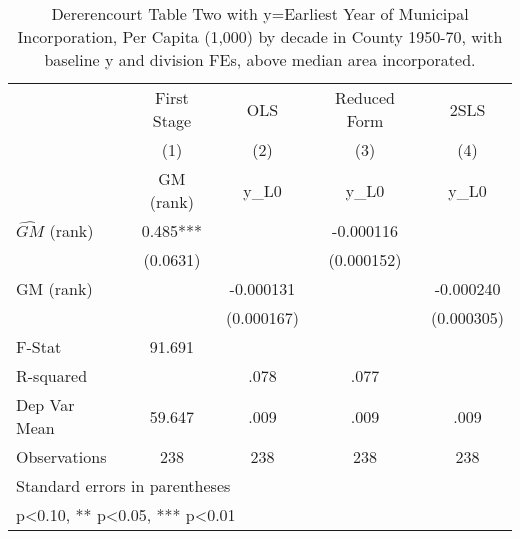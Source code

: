 \begin{table}[htbp]\centering
\def\sym#1{\ifmmode^{#1}\else\(^{#1}\)\fi}
\caption{Dererencourt Table Two with y=Earliest Year of Municipal Incorporation, Per Capita (1,000) by decade in County 1950-70, with baseline y and division FEs, above median area incorporated.}
\begin{tabular}{l*{4}{c}}
\toprule
                    & First Stage   &         OLS   &Reduced Form   &        2SLS   \\
                    &\multicolumn{1}{c}{(1)}&\multicolumn{1}{c}{(2)}&\multicolumn{1}{c}{(3)}&\multicolumn{1}{c}{(4)}\\
                    &\multicolumn{1}{c}{GM  (rank)}&\multicolumn{1}{c}{y\_L0}&\multicolumn{1}{c}{y\_L0}&\multicolumn{1}{c}{y\_L0}\\
\midrule
$\hat{GM}$ (rank)   &       0.485***&               &   -0.000116   &               \\
                    &    (0.0631)   &               &  (0.000152)   &               \\
\addlinespace
GM  (rank)          &               &   -0.000131   &               &   -0.000240   \\
                    &               &  (0.000167)   &               &  (0.000305)   \\
\midrule
F-Stat              &      91.691   &               &               &               \\
R-squared           &               &        .078   &        .077   &               \\
Dep Var Mean        &      59.647   &        .009   &        .009   &        .009   \\
Observations        &         238   &         238   &         238   &         238   \\
\bottomrule
\multicolumn{5}{l}{\footnotesize Standard errors in parentheses}\\
\multicolumn{5}{l}{\footnotesize * p<0.10, ** p<0.05, *** p<0.01}\\
\end{tabular}
\end{table}
